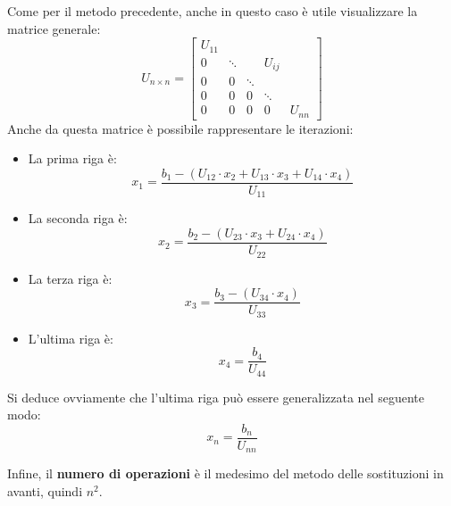 \noindent
Come per il metodo precedente, anche in questo caso è utile visualizzare la matrice generale:
\begin{equation*}
    U_{n \times n} = \begin{bmatrix}
        U_{11} &   &   &   &   \\
        0 & \ddots &   & U_{ij} & \\
        0 & 0 & \ddots &   &   \\
        0 & 0 & 0 & \ddots &   \\
        0 & 0 & 0 & 0 & U_{nn}
    \end{bmatrix}
\end{equation*}
Anche da questa matrice è possibile rappresentare le iterazioni:
\begin{itemize}
    \item La prima riga è:
    \begin{equation*}
        x_{1} = \dfrac{
            b_{1} - (U_{12} \cdot x_{2} + U_{13} \cdot x_{3} + U_{14} \cdot x_{4})
        }{
            U_{11}
        }
    \end{equation*}

    \item La seconda riga è:
    \begin{equation*}
        x_{2} = \dfrac{
            b_{2} - (U_{23} \cdot x_{3} + U_{24} \cdot x_{4})
        }{
            U_{22}
        }
    \end{equation*}

    \item La terza riga è:
    \begin{equation*}
        x_{3} = \dfrac{
            b_{3} - (U_{34} \cdot x_{4})
        }{
            U_{33}
        }
    \end{equation*}

    \item L'ultima riga è:
    \begin{equation*}
        x_{4} = \dfrac{
            b_{4}
        }{
            U_{44}
        }
    \end{equation*}
\end{itemize}
Si deduce ovviamente che l'ultima riga può essere generalizzata nel seguente modo:
\begin{equation*}
    x_{n} = \dfrac{b_{n}}{U_{nn}}
\end{equation*}

\noindent
Infine, il \textbf{numero di operazioni} è il medesimo del metodo delle sostituzioni in avanti, quindi $n^{2}$.

